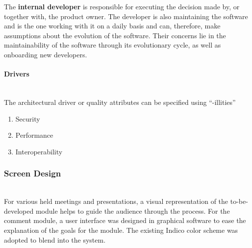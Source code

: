 The \textbf{internal developer} is responsible for executing the decision made by, or together with, the product owner. The developer is also maintaining the software and is the one working with it on a daily basis and can, therefore, make assumptions about the evolution of the software. Their concerns lie in the maintainability of the software through its evolutionary cycle, as well as onboarding new developers.
\vspace{0.5cm}
\paragraph{Drivers}\mbox{}\\

The architectural driver or quality attributes can be specified using “-illities”

\begin{enumerate}
    \item Security
    \item Performance
    \item Interoperability
\end{enumerate}

\subsubsection{Screen Design}\mbox{}\\

For various held meetings and presentations, a visual representation of the to-be-developed module helps to guide the audience through the process. For the comment module, a user interface was designed in graphical software to ease the explanation of the goals for the module. The existing Indico color scheme was adopted to blend into the system.

